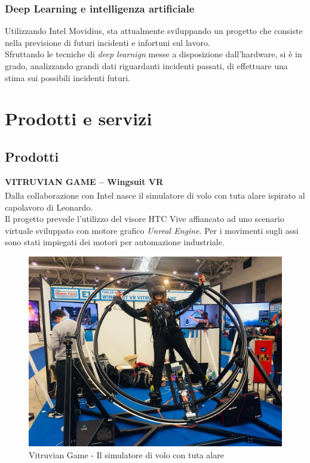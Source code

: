 \subsubsection{Deep Learning e intelligenza artificiale}
Utilizzando Intel Movidius, \lab{} sta attualmente sviluppando un progetto che consiste nella previsione di futuri incidenti e infortuni sul lavoro.\\
Sfruttando le tecniche di \textit{deep learnign} messe a disposizione dall'hardware, si è in grado, analizzando grandi dati riguardanti incidenti passati, di effettuare una stima sui possibili incidenti futuri.

\section{Prodotti e servizi}
\subsection{Prodotti}
\textbf{VITRUVIAN GAME – Wingsuit VR}
\\
Dalla collaborazione con Intel\textsuperscript{\textregistered} nasce il simulatore di volo con tuta alare ispirato al capolavoro di Leonardo.\\
Il progetto prevede l'utilizzo del visore HTC Vive affiancato ad uno scenario virtuale sviluppato con motore grafico \textit{Unreal Engine}. Per i movimenti sugli assi sono stati impiegati dei motori per automazione industriale.
\\
\begin{figure}[H]
	\begin{center}
	\includegraphics[scale=0.15]{immagini/vitruvian.jpg}
	\caption{Vitruvian Game - Il simulatore di volo con tuta alare}
	\end{center}
\end{figure}

